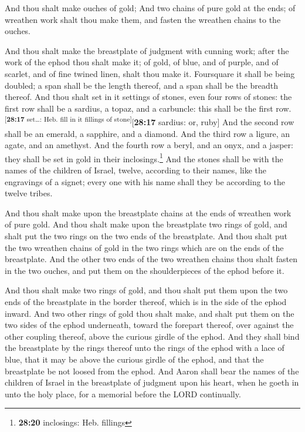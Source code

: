  And thou shalt make ouches of gold;  And
two chains of pure gold at the ends; of wreathen work shalt thou make
them, and fasten the wreathen chains to the ouches.

 And thou shalt make the breastplate of judgment with
cunning work; after the work of the ephod thou shalt make it; of gold,
of blue, and of purple, and of scarlet, and of fine twined linen, shalt
thou make it.  Foursquare it shall be being doubled; a
span shall be the length thereof, and a span shall be the breadth
thereof.  And thou shalt set in it settings of stones,
even four rows of stones: the first row shall be a sardius, a topaz, and
a carbuncle: this shall be the first
row.\textsuperscript{{[}\textbf{28:17} set\ldots: Heb. fill in it
fillings of stone{]}}{[}\textbf{28:17} sardius: or, ruby{]}
 And the second row shall be an emerald, a sapphire, and
a diamond.  And the third row a ligure, an agate, and an
amethyst.  And the fourth row a beryl, and an onyx, and a
jasper: they shall be set in gold in their inclosings.\footnote{\textbf{28:20}
  inclosings: Heb. fillings}  And the stones shall be
with the names of the children of Israel, twelve, according to their
names, like the engravings of a signet; every one with his name shall
they be according to the twelve tribes.

 And thou shalt make upon the breastplate chains at the
ends of wreathen work of pure gold.  And thou shalt make
upon the breastplate two rings of gold, and shalt put the two rings on
the two ends of the breastplate.  And thou shalt put the
two wreathen chains of gold in the two rings which are on the ends of
the breastplate.  And the other two ends of the two
wreathen chains thou shalt fasten in the two ouches, and put them on the
shoulderpieces of the ephod before it.

 And thou shalt make two rings of gold, and thou shalt
put them upon the two ends of the breastplate in the border thereof,
which is in the side of the ephod inward.  And two other
rings of gold thou shalt make, and shalt put them on the two sides of
the ephod underneath, toward the forepart thereof, over against the
other coupling thereof, above the curious girdle of the ephod.
 And they shall bind the breastplate by the rings thereof
unto the rings of the ephod with a lace of blue, that it may be above
the curious girdle of the ephod, and that the breastplate be not loosed
from the ephod.  And Aaron shall bear the names of the
children of Israel in the breastplate of judgment upon his heart, when
he goeth in unto the holy place, for a memorial before the LORD
continually.

